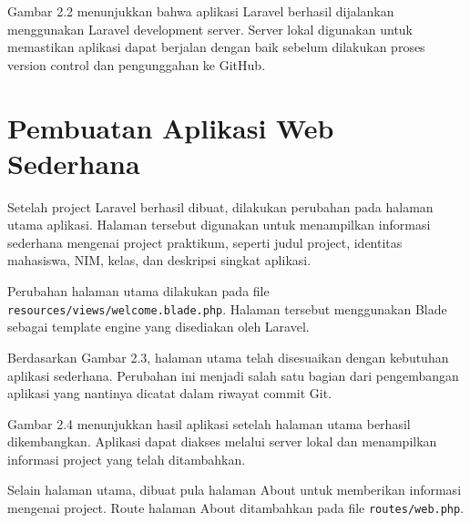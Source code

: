 \documentclass[a4paper,oneside,11pt]{book}
\begin{document}

Gambar 2.2 menunjukkan bahwa aplikasi Laravel berhasil dijalankan menggunakan Laravel development server. Server lokal digunakan untuk memastikan aplikasi dapat berjalan dengan baik sebelum dilakukan proses version control dan pengunggahan ke GitHub.

\section{Pembuatan Aplikasi Web Sederhana}

Setelah project Laravel berhasil dibuat, dilakukan perubahan pada halaman utama aplikasi. Halaman tersebut digunakan untuk menampilkan informasi sederhana mengenai project praktikum, seperti judul project, identitas mahasiswa, NIM, kelas, dan deskripsi singkat aplikasi.

Perubahan halaman utama dilakukan pada file \texttt{resources/views/welcome.blade.php}. Halaman tersebut menggunakan Blade sebagai template engine yang disediakan oleh Laravel.


Berdasarkan Gambar 2.3, halaman utama telah disesuaikan dengan kebutuhan aplikasi sederhana. Perubahan ini menjadi salah satu bagian dari pengembangan aplikasi yang nantinya dicatat dalam riwayat commit Git.


Gambar 2.4 menunjukkan hasil aplikasi setelah halaman utama berhasil dikembangkan. Aplikasi dapat diakses melalui server lokal dan menampilkan informasi project yang telah ditambahkan.

Selain halaman utama, dibuat pula halaman About untuk memberikan informasi mengenai project. Route halaman About ditambahkan pada file \texttt{routes/web.php}.
\end{document}
